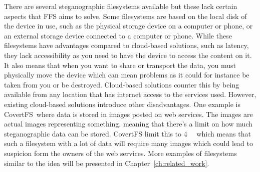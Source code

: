 There are several steganographic filesystems available but these lack certain aspects that FFS aims to solve. Some filesystems are based on the local disk of the device in use, such as the physical storage device on a computer or phone, or an external storage device connected to a computer or phone. While these filesystems have advantages compared to cloud-based solutions, such as latency, they lack accessibility as you need to have the device to access the content on it. It also means that when you want to share or transport the data, you must physically move the device which can mean problems as it could for instance be taken from you or be destroyed. Cloud-based solutions counter this by being available from any location that has internet access to the services used. However, existing cloud-based solutions introduce other disadvantages. One example is CovertFS\,\cite{baliga2007web} where data is stored in images posted on web services. The images are actual images representing something, meaning that there's a limit on how much steganographic data can be stored. CovertFS limit this to \SI{4}{\kilo\byte} which means that such a filesystem with a lot of data will require many images which could lead to suspicion form the owners of the web services. More examples of filesystems similar to the idea will be presented in Chapter~\ref{ch:related_work}. 